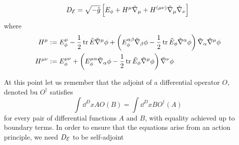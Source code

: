 \begin{equation}\label{DE}
  D_{\mathcal{E}} =\sqrt{-\tilde{g}}\left[E_\phi +H^\mu\tilde{\nabla}_\mu +H^{(\mu\nu )}\tilde{\nabla}_\mu\tilde{\nabla}_\nu \right]
\end{equation}
where
\begin{align}
  H^\mu &:=E^\mu_\phi -\frac{1}{2}\tr\tilde{E}\tilde{\nabla}^\mu\phi +\left(E^{\alpha\beta }_\phi\tilde{\nabla}_\beta \phi -\frac{1}{2}\tr \tilde{E}_\phi\tilde{\nabla}^\alpha\phi \right)\tilde{\nabla}_\alpha\tilde{\nabla}^\mu\phi \\
  H^{\mu\nu }&:=E^{\mu\nu }_\phi+\left(E^{\mu\alpha }_\phi \tilde{\nabla}_\alpha \phi-\frac{1}{2}\tr\tilde{E}_\phi\tilde{\nabla}^\mu\phi \right)\tilde{\nabla}^\nu\phi 
\end{align}



At this point let us remember that the adjoint of a differential operator $O$, denoted bu $O^\dagger$  satisfies
\begin{equation}
	\int\dd^Dx AO(B)=\int\dd ^DxBO^\dagger(A)
\end{equation}
for every pair of differential functions $A$ and $B$, with equality achieved up to boundary terms.
In order to ensure that the equations arise from an action principle, we need $D_{\mathcal{E}} $ to be self-adjoint

